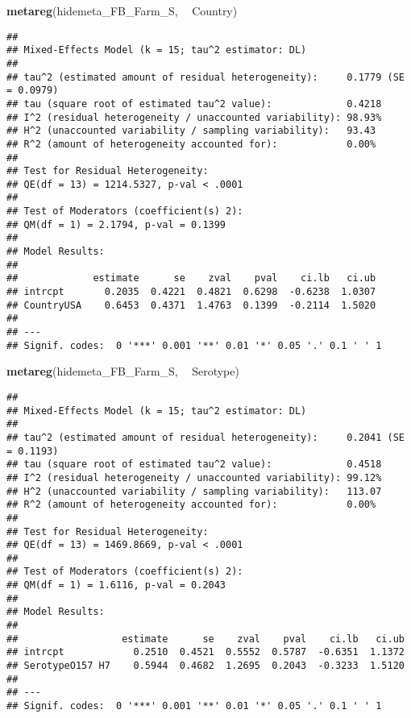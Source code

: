 \documentclass[]{article}
\newenvironment{Shaded}{\begin{snugshade}}{\end{snugshade}}
\newcommand{\KeywordTok}[1]{\textcolor[rgb]{0.13,0.29,0.53}{\textbf{#1}}}
\newcommand{\StringTok}[1]{\textcolor[rgb]{0.31,0.60,0.02}{#1}}
\newcommand{\OperatorTok}[1]{\textcolor[rgb]{0.81,0.36,0.00}{\textbf{#1}}}
\newcommand{\NormalTok}[1]{#1}
\begin{document}
\begin{Shaded}
\begin{Highlighting}[]
\KeywordTok{metareg}\NormalTok{(hidemeta_FB_Farm_S, }\OperatorTok{~}\StringTok{ }\NormalTok{Country)}
\end{Highlighting}
\end{Shaded}

\begin{verbatim}
## 
## Mixed-Effects Model (k = 15; tau^2 estimator: DL)
## 
## tau^2 (estimated amount of residual heterogeneity):     0.1779 (SE = 0.0979)
## tau (square root of estimated tau^2 value):             0.4218
## I^2 (residual heterogeneity / unaccounted variability): 98.93%
## H^2 (unaccounted variability / sampling variability):   93.43
## R^2 (amount of heterogeneity accounted for):            0.00%
## 
## Test for Residual Heterogeneity: 
## QE(df = 13) = 1214.5327, p-val < .0001
## 
## Test of Moderators (coefficient(s) 2): 
## QM(df = 1) = 2.1794, p-val = 0.1399
## 
## Model Results:
## 
##             estimate      se    zval    pval    ci.lb   ci.ub   
## intrcpt       0.2035  0.4221  0.4821  0.6298  -0.6238  1.0307   
## CountryUSA    0.6453  0.4371  1.4763  0.1399  -0.2114  1.5020   
## 
## ---
## Signif. codes:  0 '***' 0.001 '**' 0.01 '*' 0.05 '.' 0.1 ' ' 1
\end{verbatim}

\begin{Shaded}
\begin{Highlighting}[]
\KeywordTok{metareg}\NormalTok{(hidemeta_FB_Farm_S, }\OperatorTok{~}\StringTok{ }\NormalTok{Serotype)}
\end{Highlighting}
\end{Shaded}

\begin{verbatim}
## 
## Mixed-Effects Model (k = 15; tau^2 estimator: DL)
## 
## tau^2 (estimated amount of residual heterogeneity):     0.2041 (SE = 0.1193)
## tau (square root of estimated tau^2 value):             0.4518
## I^2 (residual heterogeneity / unaccounted variability): 99.12%
## H^2 (unaccounted variability / sampling variability):   113.07
## R^2 (amount of heterogeneity accounted for):            0.00%
## 
## Test for Residual Heterogeneity: 
## QE(df = 13) = 1469.8669, p-val < .0001
## 
## Test of Moderators (coefficient(s) 2): 
## QM(df = 1) = 1.6116, p-val = 0.2043
## 
## Model Results:
## 
##                  estimate      se    zval    pval    ci.lb   ci.ub   
## intrcpt            0.2510  0.4521  0.5552  0.5787  -0.6351  1.1372   
## SerotypeO157 H7    0.5944  0.4682  1.2695  0.2043  -0.3233  1.5120   
## 
## ---
## Signif. codes:  0 '***' 0.001 '**' 0.01 '*' 0.05 '.' 0.1 ' ' 1
\end{verbatim}
\end{document}
